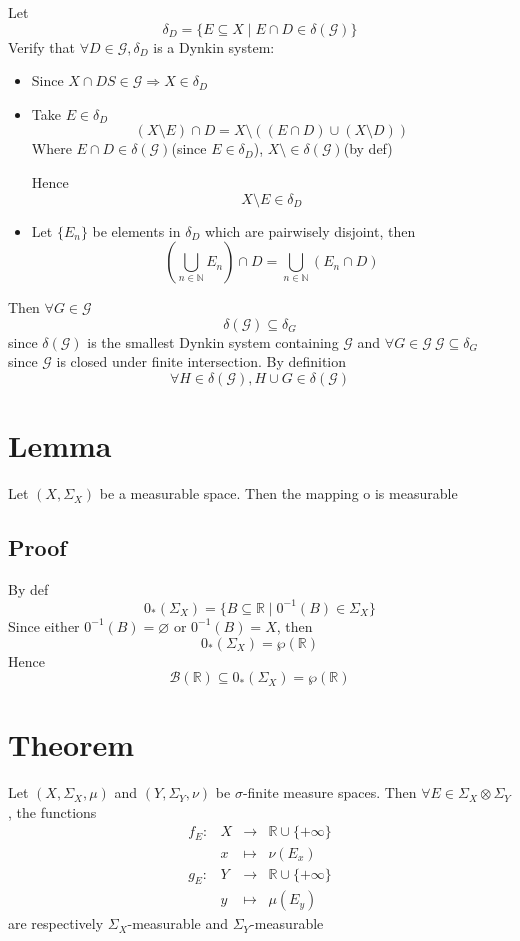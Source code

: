 \documentclass{book}
\begin{document}
Let $$\delta_D=\{E\subseteq X\mid E\cap D\in \delta(\mathcal{G})\}$$
Verify that $\forall D\in \mathcal{G},\delta_D$ is a Dynkin system:
\begin{itemize}
    \item Since $X\cap DS\in \mathcal{G}\Rightarrow X\in \delta_D$
    \item Take $E\in \delta_D$
    $$(X\setminus E)\cap D=X\setminus((E\cap D)\cup(X\setminus D))$$
    Where $E\cap D\in \delta(\mathcal{G})$(since $E\in \delta_D$), $X\setminus\in \delta(\mathcal{G})$(by def)

    Hence $$X\setminus E\in \delta_D$$
    \item Let $\{E_n\}$ be elements in $\delta_D$ which are pairwisely disjoint, then $$(\bigcup\limits_{n\in \mathbb{N}}E_n)\cap D=\bigcup\limits_{n\in \mathbb{N}}(E_n\cap D)$$
    
\end{itemize}
Then $\forall G\in \mathcal{G}$$$\delta(\mathcal{G})\subseteq\delta_G$$
    since $\delta(\mathcal{G})$ is the smallest Dynkin system containing $\mathcal{G}$ and $\forall G\in \mathcal{G}\ \mathcal{G}\subseteq\delta_G$ since $\mathcal{G}$ is closed under finite intersection. By definition$$\forall H\in \delta(\mathcal{G}), H\cup G\in\delta(\mathcal{G})$$
\section{Lemma}
Let $(X,\Sigma_X)$ be a measurable space. Then the mapping o is measurable
\subsection*{Proof}
By def $$0_*(\Sigma_X)=\{B\subseteq\mathbb{R}\mid 0^{-1}(B)\in \Sigma_X\}$$
Since either $0^{-1}(B)=\varnothing$ or $0^{-1}(B)=X$, then $$0_*(\Sigma_X)=\wp(\mathbb{R})$$
Hence $$\mathscr{B}(\mathbb{R})\subseteq 0_*(\Sigma_X)=\wp(\mathbb{R})$$
\section{Theorem}
Let $(X,\Sigma_X,\mu)$ and $(Y,\Sigma_Y,\nu)$ be $\sigma$-finite measure spaces. Then $\forall E\in \Sigma_X\otimes\Sigma_Y$, the functions
$$\begin{aligned}
    f_E: &X &\rightarrow &\mathbb{R}\cup\{+\infty\}\\ &x &\mapsto &\nu(E_x)\\
    g_E: &Y &\rightarrow &\mathbb{R}\cup\{+\infty\}\\ &y &\mapsto &\mu(E_y)
\end{aligned}$$
are respectively $\Sigma_X$-measurable and $\Sigma_Y$-measurable
\end{document}
